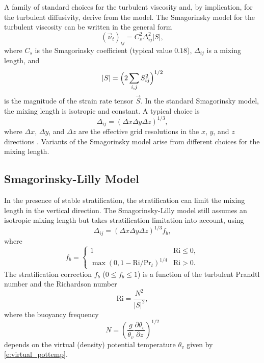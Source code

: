 \documentclass{report}
\begin{document}
A family of standard choices for the turbulent viscosity and, by implication, for the turbulent diffusivity, derive from the \citet{smagorinsky:1963} model. The Smagorinsky model for the turbulent viscosity can be written in the general form 
\begin{equation}
(\vec{\nu}_t)_{ij} = C_{s}^2 \Delta^{2}_{ij} |S|,   
\label{e:eddy-viscosity_smag}
\end{equation}
where $C_{s} $ is the Smagorinsky coefficient (typical value $0.18$), $\Delta_{ij}$ is a mixing length, and 
\begin{equation}
|S| = \Bigl(2 \sum_{i,j} S_{ij}^2 \Bigr)^{1/2}
\end{equation} 
is the magnitude of the strain rate tensor $\vec{S}$. In the standard Smagorinsky model, the mixing length is isotropic and constant. A typical choice is 
\begin{equation}
    \Delta_{ij} = (\Delta x \Delta y \Delta z)^{1/3},
\end{equation}
where $\Delta x$, $\Delta y$, and $\Delta z$ are the effective grid resolutions in the $x$, $y$, and $z$ directions \citep{deardorff1970}. Variants of the Smagorinsky model arise from different choices for the mixing length.

\subsection{Smagorinsky-Lilly Model}

In the presence of stable stratification, the stratification can limit the mixing length  in the vertical direction. The Smagorinsky-Lilly model \citep{smagorinsky:1963, lilly:1962} still assumes an isotropic mixing length  but takes stratification limitation into account, using 
\begin{equation}\label{e:smag-lilly}
\Delta_{ij} = (\Delta x \Delta y \Delta z)^{1/3} f_{b},   
\end{equation}
where 
\begin{equation}\label{e:Lilly_strat}
f_{b} = 
    \begin{cases}
    1 & \mathrm{Ri} \leq 0 ,\\
    \max(0, 1 - \mathrm{Ri} / \mathrm{Pr}_{t})^{1/4} & \mathrm{Ri} > 0 .
    \end{cases}
\end{equation}
The stratification correction $f_{b}$ ($0 \leq f_b \leq 1$) is a function of the turbulent Prandtl number  and the Richardson number 
\[
\mathrm{Ri} =  \frac{N^2}{{|S|}^2},
\]
where the buoyancy frequency
\[
N = \left( \frac{g}{\theta_v} \frac{\partial \theta_v}{\partial z}\right)^{1/2}
\]
depends on the virtual (density) potential temperature $\theta_v$ given by \eqref{e:virtual_pottemp}.
 
\end{document}
